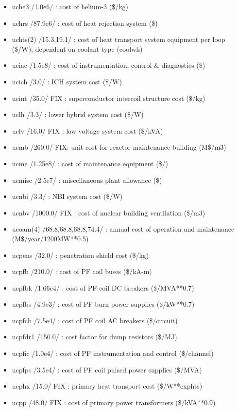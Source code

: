\documentclass[]{article}
\begin{document}
\begin{itemize}
\item
  uche3 /1.0e6/ : cost of helium-3 (\$/kg)
\item
  uchrs /87.9e6/ : cost of heat rejection system (\$)
\item
  uchts(2) /15.3,19.1/ : cost of heat transport system equipment per
  loop (\$/W); dependent on coolant type (coolwh)
\item
  uciac /1.5e8/ : cost of instrumentation, control \& diagnostics (\$)
\item
  ucich /3.0/ : ICH system cost (\$/W)
\item
  ucint /35.0/ FIX : superconductor intercoil structure cost (\$/kg)
\item
  uclh /3.3/ : lower hybrid system cost (\$/W)
\item
  uclv /16.0/ FIX : low voltage system cost (\$/kVA)
\item
  ucmb /260.0/ FIX: unit cost for reactor maintenance building (M\$/m3)
\item
  ucme /1.25e8/ : cost of maintenance equipment (\$/)
\item
  ucmisc /2.5e7/ : miscellaneous plant allowance (\$)
\item
  ucnbi /3.3/ : NBI system cost (\$/W)
\item
  ucnbv /1000.0/ FIX : cost of nuclear building ventilation (\$/m3)
\item
  ucoam(4) /68.8,68.8,68.8,74.4/ : annual cost of operation and
  maintenance (M\$/year/1200MW**0.5)
\item
  ucpens /32.0/ : penetration shield cost (\$/kg)
\item
  ucpfb /210.0/ : cost of PF coil buses (\$/kA-m)
\item
  ucpfbk /1.66e4/ : cost of PF coil DC breakers (\$/MVA**0.7)
\item
  ucpfbs /4.9e3/ : cost of PF burn power supplies (\$/kW**0.7)
\item
  ucpfcb /7.5e4/ : cost of PF coil AC breakers (\$/circuit)
\item
  ucpfdr1 /150.0/ : cost factor for dump resistors (\$/MJ)
\item
  ucpfic /1.0e4/ : cost of PF instrumentation and control (\$/channel)
\item
  ucpfps /3.5e4/ : cost of PF coil pulsed power supplies (\$/MVA)
\item
  ucphx /15.0/ FIX : primary heat transport cost (\$/W**exphts)
\item
  ucpp /48.0/ FIX : cost of primary power transformers (\$/kVA**0.9)

\end{itemize}
\end{document}
